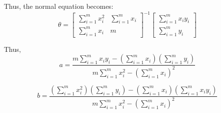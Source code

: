 \documentclass[12pt]{article}
\begin{document}
Thus, the normal equation becomes:
\[
\theta =
\begin{bmatrix}
\sum_{i=1}^m x_i^2 & \sum_{i=1}^m x_i \\
\sum_{i=1}^m x_i & m
\end{bmatrix}^{-1}
\begin{bmatrix}
\sum_{i=1}^m x_i y_i \\
\sum_{i=1}^m y_i
\end{bmatrix}
\]

Thus,
\[
a = \frac{
m \sum_{i=1}^m x_i y_i - \left( \sum_{i=1}^m x_i \right) \left( \sum_{i=1}^m y_i \right)
}{
m \sum_{i=1}^m x_i^2 - \left( \sum_{i=1}^m x_i \right)^2
}
\]

\[
b = \frac{
\left( \sum_{i=1}^m x_i^2 \right) \left( \sum_{i=1}^m y_i \right)
- \left( \sum_{i=1}^m x_i \right) \left( \sum_{i=1}^m x_i y_i \right)
}{
m \sum_{i=1}^m x_i^2 - \left( \sum_{i=1}^m x_i \right)^2
}
\]
\end{document}
